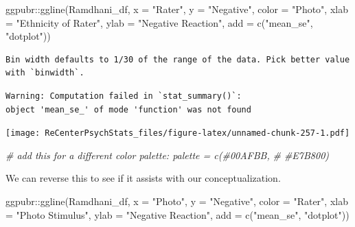 \documentclass[
  11pt,
]{book}
\newenvironment{Shaded}{\begin{snugshade}}{\end{snugshade}}
\newcommand{\AttributeTok}[1]{\textcolor[rgb]{0.77,0.63,0.00}{#1}}
\newcommand{\CommentTok}[1]{\textcolor[rgb]{0.56,0.35,0.01}{\textit{#1}}}
\newcommand{\FunctionTok}[1]{\textcolor[rgb]{0.00,0.00,0.00}{#1}}
\newcommand{\NormalTok}[1]{#1}
\newcommand{\SpecialCharTok}[1]{\textcolor[rgb]{0.00,0.00,0.00}{#1}}
\newcommand{\StringTok}[1]{\textcolor[rgb]{0.31,0.60,0.02}{#1}}
\begin{document}
\begin{Shaded}
\begin{Highlighting}[]
\NormalTok{ggpubr}\SpecialCharTok{::}\FunctionTok{ggline}\NormalTok{(Ramdhani\_df, }\AttributeTok{x =} \StringTok{"Rater"}\NormalTok{, }\AttributeTok{y =} \StringTok{"Negative"}\NormalTok{, }\AttributeTok{color =} \StringTok{"Photo"}\NormalTok{,}
    \AttributeTok{xlab =} \StringTok{"Ethnicity of Rater"}\NormalTok{, }\AttributeTok{ylab =} \StringTok{"Negative Reaction"}\NormalTok{, }\AttributeTok{add =} \FunctionTok{c}\NormalTok{(}\StringTok{"mean\_se"}\NormalTok{,}
        \StringTok{"dotplot"}\NormalTok{))}
\end{Highlighting}
\end{Shaded}

\begin{verbatim}
Bin width defaults to 1/30 of the range of the data. Pick better value with `binwidth`.
\end{verbatim}

\begin{verbatim}
Warning: Computation failed in `stat_summary()`:
object 'mean_se_' of mode 'function' was not found
\end{verbatim}

\texttt{[image: ReCenterPsychStats\_files/figure-latex/unnamed-chunk-257-1.pdf]}

\begin{Shaded}
\begin{Highlighting}[]
\CommentTok{\# add this for a different color palette: palette = c(\textquotesingle{}\#00AFBB\textquotesingle{},}
\CommentTok{\# \textquotesingle{}\#E7B800\textquotesingle{})}
\end{Highlighting}
\end{Shaded}

We can reverse this to see if it assists with our conceptualization.

\begin{Shaded}
\begin{Highlighting}[]
\NormalTok{ggpubr}\SpecialCharTok{::}\FunctionTok{ggline}\NormalTok{(Ramdhani\_df, }\AttributeTok{x =} \StringTok{"Photo"}\NormalTok{, }\AttributeTok{y =} \StringTok{"Negative"}\NormalTok{, }\AttributeTok{color =} \StringTok{"Rater"}\NormalTok{,}
    \AttributeTok{xlab =} \StringTok{"Photo Stimulus"}\NormalTok{, }\AttributeTok{ylab =} \StringTok{"Negative Reaction"}\NormalTok{, }\AttributeTok{add =} \FunctionTok{c}\NormalTok{(}\StringTok{"mean\_se"}\NormalTok{,}
        \StringTok{"dotplot"}\NormalTok{))}
\end{Highlighting}
\end{Shaded}
\end{document}
